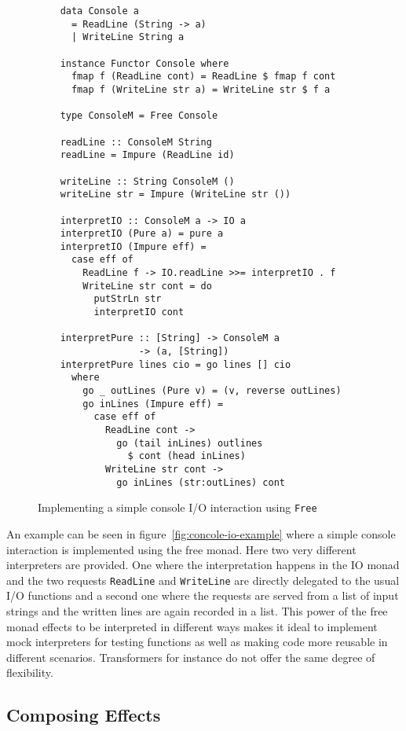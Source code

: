 \begin{figure}
  \begin{lstlisting}
    data Console a
      = ReadLine (String -> a)
      | WriteLine String a

    instance Functor Console where
      fmap f (ReadLine cont) = ReadLine $ fmap f cont
      fmap f (WriteLine str a) = WriteLine str $ f a

    type ConsoleM = Free Console
      
    readLine :: ConsoleM String
    readLine = Impure (ReadLine id)

    writeLine :: String ConsoleM ()
    writeLine str = Impure (WriteLine str ())

    interpretIO :: ConsoleM a -> IO a
    interpretIO (Pure a) = pure a
    interpretIO (Impure eff) =
      case eff of
        ReadLine f -> IO.readLine >>= interpretIO . f
        WriteLine str cont = do
          putStrLn str
          interpretIO cont
        
    interpretPure :: [String] -> ConsoleM a
                  -> (a, [String])
    interpretPure lines cio = go lines [] cio
      where
        go _ outLines (Pure v) = (v, reverse outLines)
        go inLines (Impure eff) =
          case eff of
            ReadLine cont ->
              go (tail inLines) outlines
                $ cont (head inLines)
            WriteLine str cont ->
              go inLines (str:outLines) cont
  \end{lstlisting}
  \caption{Implementing a simple console I/O interaction using
    \texttt{Free}}
  \label{fig:console-io-example}
\end{figure}

An example can be seen in figure~\ref{fig:concole-io-example} where a
simple console interaction is implemented using the free monad. Here
two very different interpreters are provided. One where the
interpretation happens in the IO monad and the two requests
\texttt{ReadLine} and \texttt{WriteLine} are directly delegated to the
usual I/O functions and a second one where the requests are served
from a list of input strings and the written lines are again recorded
in a list. This power of the free monad effects to be interpreted in
different ways makes it ideal to implement mock interpreters for
testing functions as well as making code more reusable in different
scenarios. Transformers for instance do not offer the same degree of
flexibility.

\subsection{Composing Effects}


